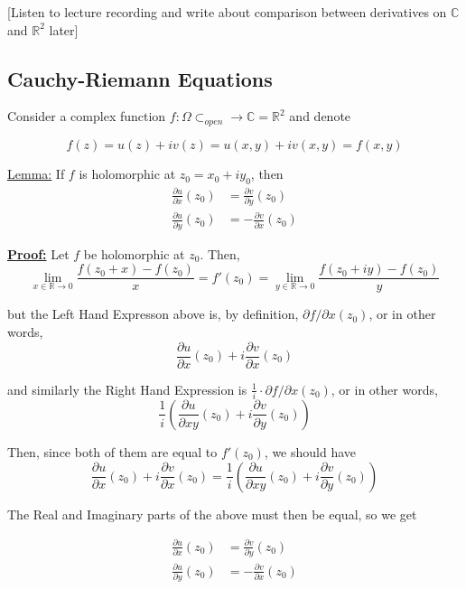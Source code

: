 \documentclass{article}
\newcommand{\R}{\mathbb{R}}
\newcommand{\C}{\mathbb{C}}
\begin{document}
[Listen to lecture recording and write about comparison between derivatives on $\C$ and $\R^2$ later]

\vskip 1cm
\subsection{Cauchy-Riemann Equations}

Consider a complex function $f : \Omega \subset_{open} \rightarrow \C = \R^2$ and denote

\[ f(z) = u(z) + iv(z) = u(x, y) + iv(x, y) = f(x, y)  \]

\vskip 0.5cm
\begin{dottedbox}
  \underline{Lemma:} If $f$ is holomorphic at $z_0 = x_0 + i y_0$, then 
  \begin{align*}
    \frac{\partial u}{\partial x}(z_0) &= \frac{\partial v}{\partial y}(z_0) \\
    \frac{\partial u}{\partial y}(z_0) &= - \frac{\partial v}{\partial x}(z_0) 
  \end{align*}
\end{dottedbox}

\vskip 0.5cm
\underline{\textbf{Proof:}} Let $f$ be holomorphic at $z_0$. Then, 
\[ \lim_{x \in \R \rightarrow 0} \frac{f(z_0 + x) - f(z_0)}{x} = f'(z_0) = \lim_{y \in \R \rightarrow 0} \frac{f(z_0 + iy) - f(z_0)}{y} \]

but the Left Hand Expresson above is, by definition, $\partial f / \partial x (z_0)$, or in other words, 
\[ \frac{\partial u}{\partial x}(z_0) + i \frac{\partial v}{\partial x}(z_0) \]

and similarly the Right Hand Expression is $\frac{1}{i} \cdot \partial f / \partial x (z_0)$, or in other words, 
\[ \frac{1}{i} \left( \frac{\partial u}{\partial xy}(z_0) + i \frac{\partial v}{\partial y}(z_0) \right) \]

Then, since both of them are equal to $f'(z_0)$, we should have 
\[ \boxed{\frac{\partial u}{\partial x}(z_0) + i \frac{\partial v}{\partial x}(z_0) = \frac{1}{i} \left( \frac{\partial u}{\partial xy}(z_0) + i \frac{\partial v}{\partial y}(z_0) \right) }\]

The Real and Imaginary parts of the above must then be equal, so we get 

\begin{align*}
    \frac{\partial u}{\partial x}(z_0) &= \frac{\partial v}{\partial y}(z_0) \\
    \frac{\partial u}{\partial y}(z_0) &= - \frac{\partial v}{\partial x}(z_0) 
\end{align*}
\end{document}
